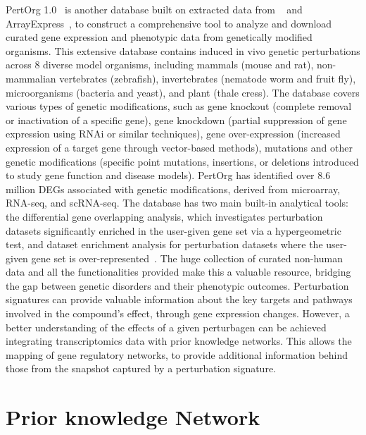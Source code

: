 PertOrg 1.0~\cite{RN85} is another database built on extracted data from ~\cite{RN98} and ArrayExpress~\cite{RN122}, to construct a comprehensive tool to analyze and download curated gene expression and phenotypic data from genetically modified organisms. 
This extensive database contains induced in vivo genetic perturbations across 8 diverse model organisms, including mammals (mouse and rat), non-mammalian vertebrates (zebrafish), invertebrates (nematode worm and fruit fly), microorganisms (bacteria and yeast), and plant (thale cress). The database covers various types of genetic modifications, such as gene knockout (complete removal or inactivation of a specific gene), gene knockdown (partial suppression of gene expression using RNAi or similar techniques), gene over-expression (increased expression of a target gene through vector-based methods), mutations and other genetic modifications (specific point mutations, insertions, or deletions introduced to study gene function and disease models). 
PertOrg has identified over 8.6 million DEGs associated with genetic modifications, derived from microarray, RNA-seq, and scRNA-seq. 
The database has two main built-in analytical tools: the differential gene overlapping analysis, which investigates perturbation datasets significantly enriched in the user-given gene set via a hypergeometric test, and dataset enrichment analysis for perturbation datasets where the user-given gene set is over-represented~\cite{RN85}. 
The huge collection of curated non-human data and all the functionalities provided make this a valuable resource, bridging the gap between genetic disorders and their phenotypic outcomes.
Perturbation signatures can provide valuable information about the key targets and pathways involved in the compound's effect, through gene expression changes. 
However, a better understanding of the effects of a given perturbagen can be achieved integrating transcriptomics data with prior knowledge networks. This allows the mapping of gene regulatory networks, to provide additional information behind those from the snapshot captured by a perturbation signature. 


\section{Prior knowledge Network} %
\label{sec:Prior_knowledge_Network}

